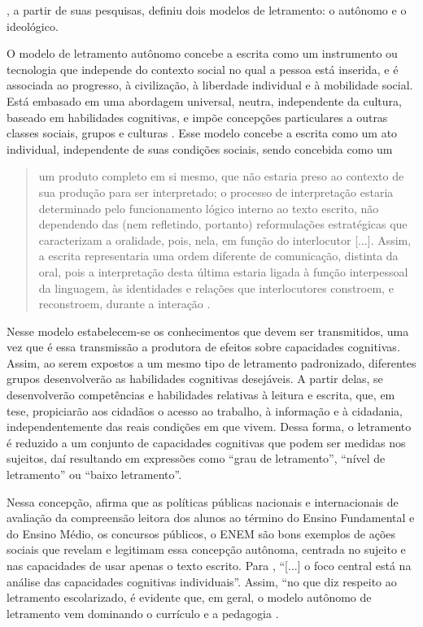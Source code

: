 \documentclass{textolivre}
\begin{document}
\textcite{street2014}, a partir de suas pesquisas, definiu dois modelos de letramento:
o autônomo e o ideológico.

O modelo de letramento autônomo concebe a escrita como um instrumento ou
tecnologia que independe do contexto social no qual a pessoa está inserida, e é
associada ao progresso, à civilização, à liberdade individual e à mobilidade
social. Está embasado em uma abordagem universal, neutra, independente da
cultura, baseado em habilidades cognitivas, e impõe concepções particulares a
outras classes sociais, grupos e culturas \cite{street2014}. Esse modelo concebe a
escrita como um ato individual, independente de suas condições sociais, sendo
concebida como um
\begin{quote}
um produto completo em si mesmo, que não estaria preso ao contexto de sua
produção para ser interpretado; o processo de interpretação estaria determinado
pelo funcionamento lógico interno ao texto escrito, não dependendo das (nem
refletindo, portanto) reformulações estratégicas que caracterizam a oralidade,
pois, nela, em função do interlocutor [...]. Assim, a escrita representaria uma
ordem diferente de comunicação, distinta da oral, pois a interpretação desta
última estaria ligada à função interpessoal da linguagem, às identidades e
relações que interlocutores constroem, e reconstroem, durante a interação
\cite[p. 22]{kleiman2003}.
\end{quote}

Nesse modelo estabelecem-se os conhecimentos que devem ser transmitidos, uma
vez que é essa transmissão a produtora de efeitos sobre capacidades cognitivas.
Assim, ao serem expostos a um mesmo tipo de letramento padronizado, diferentes
grupos desenvolverão as habilidades cognitivas desejáveis. A partir delas, se
desenvolverão competências e habilidades relativas à leitura e escrita, que, em
tese, propiciarão aos cidadãos o acesso ao trabalho, à informação e à
cidadania, independentemente das reais condições em que vivem. Dessa forma, o
letramento é reduzido a um conjunto de capacidades cognitivas que podem ser
medidas nos sujeitos, daí resultando em expressões como “grau de letramento”,
“nível de letramento” ou “baixo letramento”.

Nessa concepção, \textcite{street2014} afirma que as políticas públicas nacionais e
internacionais de avaliação da compreensão leitora dos alunos ao término do
Ensino Fundamental e do Ensino Médio, os concursos públicos, o ENEM são bons
exemplos de ações sociais que revelam e legitimam essa concepção autônoma,
centrada no sujeito e nas capacidades de usar apenas o texto escrito. Para
\textcite[p. 9]{street2014}, “[...] o foco central está na análise das capacidades
cognitivas individuais”. Assim, “no que diz respeito ao letramento
escolarizado, é evidente que, em geral, o modelo autônomo de letramento vem
dominando o currículo e a pedagogia \cite[p. 150]{street2009}.
\end{document}
